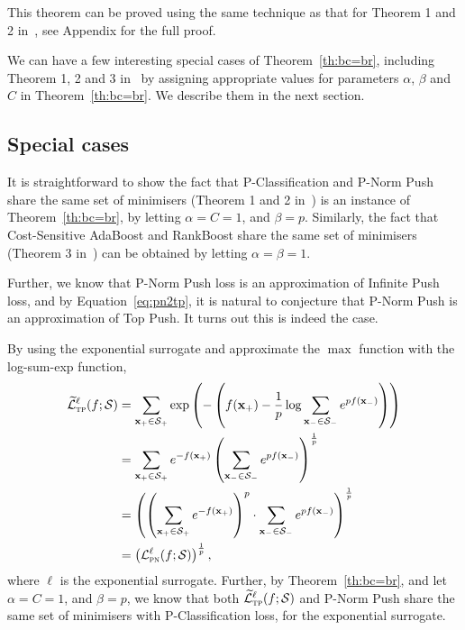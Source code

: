 This theorem can be proved using the same technique as that for Theorem 1 and 2 in~\cite{ertekin2011equivalence},
see Appendix for the full proof.

We can have a few interesting special cases of Theorem~\ref{th:bc=br},
including Theorem 1, 2 and 3 in~\cite{ertekin2011equivalence} by 
assigning appropriate values for parameters $\alpha$, $\beta$ and $C$ in Theorem~\ref{th:bc=br}.
We describe them in the next section.




\subsection{Special cases}

It is straightforward to show the fact that P-Classification and P-Norm Push share the same set of minimisers 
(Theorem 1 and 2 in~\cite{ertekin2011equivalence}) is an instance of Theorem~\ref{th:bc=br}, by letting $\alpha = C = 1$, and $\beta = p$.
Similarly, the fact that Cost-Sensitive AdaBoost and RankBoost share the same set of minimisers (Theorem 3 in~\cite{ertekin2011equivalence}) 
can be obtained by letting $\alpha = \beta = 1$.

Further, we know that P-Norm Push loss is an approximation of Infinite Push loss, and by Equation~\ref{eq:pn2tp}, 
it is natural to conjecture that P-Norm Push is an approximation of Top Push.
It turns out this is indeed the case.

By using the exponential surrogate and approximate the $\max$ function with the log-sum-exp function, \ie
\begin{equation*}
\begin{aligned}
\widetilde{\mathcal{L}}_\textsc{tp}^\ell(f; \mathcal{S})
&= \sum_{\mathbf{x}_+ \in \mathcal{S}_+} \exp \left( - \left( f(\mathbf{x}_+) - \frac{1}{p} \log \sum_{\mathbf{x}_- \in \mathcal{S}_-} e^{p f(\mathbf{x}_-)} \right) \right) \\
&= \sum_{\mathbf{x}_+ \in \mathcal{S}_+} e^{-f(\mathbf{x}_+)} \left( \sum_{\mathbf{x}_- \in \mathcal{S}_-} e^{p f(\mathbf{x}_-)} \right)^\frac{1}{p} \\
&= \left( \left( \sum_{\mathbf{x}_+ \in \mathcal{S}_+} e^{-f(\mathbf{x}_+)} \right)^p \cdot \sum_{\mathbf{x}_- \in \mathcal{S}_-} e^{p f(\mathbf{x}_-)} \right)^\frac{1}{p} \\
&= \left( \mathcal{L}_\textsc{pn}^\ell (f; \mathcal{S}) \right)^\frac{1}{p},
\end{aligned}
\end{equation*}
where $\ell$ is the exponential surrogate.
Further, by Theorem~\ref{th:bc=br}, and let $\alpha = C = 1$, and $\beta = p$,
we know that both $\widetilde{\mathcal{L}}_\textsc{tp}^\ell(f; \mathcal{S})$ and P-Norm Push share the same set of minimisers with
P-Classification loss, for the exponential surrogate.

